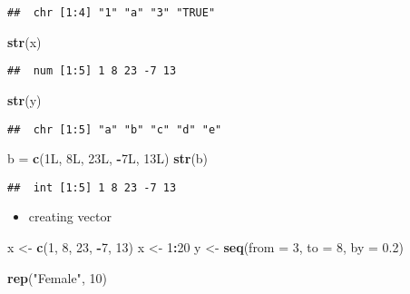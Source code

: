 \documentclass[
  a4paper,
]{article}
\newenvironment{Shaded}{\begin{snugshade}}{\end{snugshade}}
\newcommand{\AttributeTok}[1]{\textcolor[rgb]{0.13,0.29,0.53}{#1}}
\newcommand{\DataTypeTok}[1]{\textcolor[rgb]{0.13,0.29,0.53}{#1}}
\newcommand{\DecValTok}[1]{\textcolor[rgb]{0.00,0.00,0.81}{#1}}
\newcommand{\FloatTok}[1]{\textcolor[rgb]{0.00,0.00,0.81}{#1}}
\newcommand{\FunctionTok}[1]{\textcolor[rgb]{0.13,0.29,0.53}{\textbf{#1}}}
\newcommand{\NormalTok}[1]{#1}
\newcommand{\OtherTok}[1]{\textcolor[rgb]{0.56,0.35,0.01}{#1}}
\newcommand{\SpecialCharTok}[1]{\textcolor[rgb]{0.81,0.36,0.00}{\textbf{#1}}}
\newcommand{\StringTok}[1]{\textcolor[rgb]{0.31,0.60,0.02}{#1}}
\providecommand{\tightlist}{%
  \setlength{\itemsep}{0pt}\setlength{\parskip}{0pt}}
\begin{document}
\begin{verbatim}
##  chr [1:4] "1" "a" "3" "TRUE"
\end{verbatim}

\begin{Shaded}
\begin{Highlighting}[]
\FunctionTok{str}\NormalTok{(x)}
\end{Highlighting}
\end{Shaded}

\begin{verbatim}
##  num [1:5] 1 8 23 -7 13
\end{verbatim}

\begin{Shaded}
\begin{Highlighting}[]
\FunctionTok{str}\NormalTok{(y)}
\end{Highlighting}
\end{Shaded}

\begin{verbatim}
##  chr [1:5] "a" "b" "c" "d" "e"
\end{verbatim}

\begin{Shaded}
\begin{Highlighting}[]
\NormalTok{b }\OtherTok{=} \FunctionTok{c}\NormalTok{(}\DecValTok{1}\DataTypeTok{L}\NormalTok{, }\DecValTok{8}\DataTypeTok{L}\NormalTok{, }\DecValTok{23}\DataTypeTok{L}\NormalTok{, }\SpecialCharTok{{-}}\DecValTok{7}\DataTypeTok{L}\NormalTok{, }\DecValTok{13}\DataTypeTok{L}\NormalTok{)}
\FunctionTok{str}\NormalTok{(b)}
\end{Highlighting}
\end{Shaded}

\begin{verbatim}
##  int [1:5] 1 8 23 -7 13
\end{verbatim}

\begin{itemize}
\tightlist
\item
  creating vector
\end{itemize}

\begin{Shaded}
\begin{Highlighting}[]
\NormalTok{x }\OtherTok{\textless{}{-}} \FunctionTok{c}\NormalTok{(}\DecValTok{1}\NormalTok{, }\DecValTok{8}\NormalTok{, }\DecValTok{23}\NormalTok{, }\SpecialCharTok{{-}}\DecValTok{7}\NormalTok{, }\DecValTok{13}\NormalTok{)}
\NormalTok{x }\OtherTok{\textless{}{-}} \DecValTok{1}\SpecialCharTok{:}\DecValTok{20}
\NormalTok{y }\OtherTok{\textless{}{-}} \FunctionTok{seq}\NormalTok{(}\AttributeTok{from =} \DecValTok{3}\NormalTok{, }\AttributeTok{to =} \DecValTok{8}\NormalTok{, }\AttributeTok{by =} \FloatTok{0.2}\NormalTok{)}


\FunctionTok{rep}\NormalTok{(}\StringTok{"Female"}\NormalTok{, }\DecValTok{10}\NormalTok{)}
\end{Highlighting}
\end{Shaded}
\end{document}
